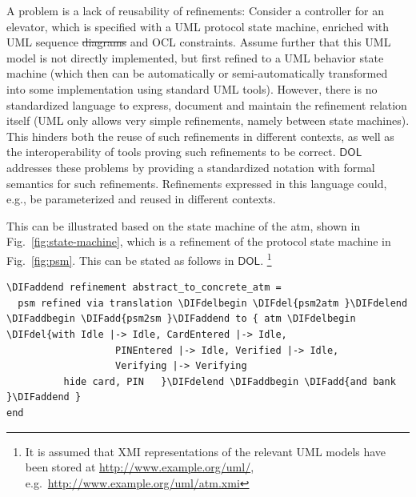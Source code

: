 \documentclass[10pt,fleqn,final]{scrreprt}
\newcommand*{\DOL}{\ensuremath{\mathsf{DOL}}\xspace}
\newenvironment{definitions}[0]{\medskip }{}
\newcommand{\uml}[1]{\textsf{#1}}
\providecommand{\DIFadd}[1]{{\protect\color{blue}\uwave{#1}}} %
\providecommand{\DIFdel}[1]{{\protect\color{red}\sout{#1}}}                      %
\providecommand{\DIFaddbegin}{} %
\providecommand{\DIFaddend}{} %
\providecommand{\DIFdelbegin}{} %
\providecommand{\DIFdelend}{} %
\begin{document}
\begin{definitions}
A problem is a lack of reusability of refinements: Consider a controller for an elevator, which is specified with a UML protocol state machine, enriched with UML 
sequence \DIFdelbegin \DIFdel{diagrams }\DIFdelend \DIFaddbegin \DIFadd{models }\DIFaddend and OCL constraints. Assume further that this UML model is not directly implemented, but first refined to a UML behavior state machine (which then 
can be automatically or semi-automatically transformed into some implementation using standard UML tools). However, there is no standardized language to 
express, document and maintain the refinement relation itself (UML only allows very simple refinements, namely between state machines). This hinders both the 
reuse of such refinements in different contexts, as well as the interoperability of tools proving such refinements to be correct. \DOL  
addresses these problems by providing a standardized notation with formal semantics for such refinements. Refinements expressed in this language could, e.g., be 
parameterized and reused in different contexts.

 This can be illustrated based on the state
machine of the \uml{atm}, shown in Fig.~\ref{fig:state-machine}, which is a  
refinement of the protocol state machine in Fig.~\ref{fig:psm}. This can be stated as follows in \DOL. 
\footnote{  It is assumed that XMI representations of the relevant UML models have been 
stored at \url{http://www.example.org/uml/},
e.g.\ \url{http://www.example.org/uml/atm.xmi} } 


\DIFdelbegin %
\DIFdelend \DIFaddbegin \begin{lstlisting}[basicstyle=\ttfamily,language=dolText,escapechar=@,mathescape]
\DIFaddend refinement abstract_to_concrete_atm =
  psm refined via translation \DIFdelbegin \DIFdel{psm2atm }\DIFdelend \DIFaddbegin \DIFadd{psm2sm }\DIFaddend to { atm \DIFdelbegin \DIFdel{with Idle |-> Idle, CardEntered |-> Idle, 
                   PINEntered |-> Idle, Verified |-> Idle, 
                   Verifying |-> Verifying 
          hide card, PIN   }\DIFdelend \DIFaddbegin \DIFadd{and bank }\DIFaddend }
end
\end{lstlisting}


\end{definitions}
\end{document}
